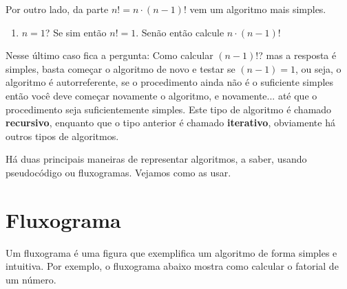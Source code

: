 Por outro lado, da parte $n! = n\cdot(n-1)!$ vem um algoritmo mais simples.
\begin{enumerate}[nosep]
\item $n=1$? Se sim então $n!=1$. Senão então calcule $n \cdot (n-1)!$
\end{enumerate}

\noindent
Nesse último caso fica a pergunta: Como calcular $(n-1)!$? mas a resposta
é simples, basta começar o algoritmo de novo e testar se $(n-1)=1$, ou seja,
o algoritmo é autorreferente, se o procedimento ainda não é o suficiente simples
então você deve começar novamente o algoritmo, e novamente... até que o procedimento
seja suficientemente simples. Este tipo de algoritmo é chamado \textbf{recursivo},
enquanto que o tipo anterior é chamado \textbf{iterativo}, obviamente há outros tipos de algoritmos.

Há duas principais maneiras de representar algoritmos, a saber, usando
pseudocódigo ou fluxogramas. Vejamos como as usar.

\section{Fluxograma}

Um fluxograma é uma figura que exemplifica um algoritmo de forma simples
e intuitiva. Por exemplo, o fluxograma abaixo mostra como calcular o
fatorial de um número.

\begin{figure}[H]
   \centering
\end{figure}

